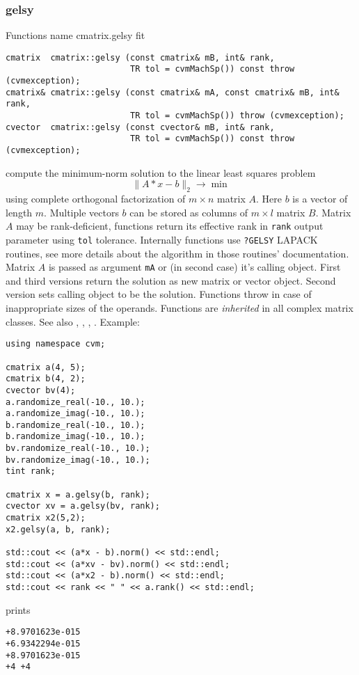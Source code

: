 \subsubsection{gelsy}
Functions%
\pdfdest name {cmatrix.gelsy} fit
\begin{verbatim}
cmatrix  cmatrix::gelsy (const cmatrix& mB, int& rank,
                         TR tol = cvmMachSp()) const throw (cvmexception);
cmatrix& cmatrix::gelsy (const cmatrix& mA, const cmatrix& mB, int& rank,
                         TR tol = cvmMachSp()) throw (cvmexception);
cvector  cmatrix::gelsy (const cvector& mB, int& rank,
                         TR tol = cvmMachSp()) const throw (cvmexception);
\end{verbatim}
compute the minimum-norm solution to the linear
least squares problem 
\begin{equation*}
\|A*x-b\|_2\to\min
\end{equation*}
using  complete orthogonal factorization of $m\times n$ matrix $A$.
Here $b$ is a vector of length $m$.
Multiple vectors $b$ can be stored as columns of $m\times l$ matrix $B$.
Matrix $A$ may be rank-deficient, functions return its effective rank in \verb"rank"
output parameter using \verb"tol" tolerance.
Internally functions use \verb"?GELSY" LAPACK routines, see more details
about the algorithm in those routines' documentation.
Matrix $A$ is passed as  argument \verb"mA" or (in second case) it's  calling object.
First and third versions return the solution as  new matrix or vector object.
Second version sets calling object to be the solution.
Functions throw
in case of inappropriate sizes of the operands.
Functions are \emph{inherited} in all complex matrix classes.
See also , , 
, .
Example:
\begin{Verbatim}
using namespace cvm;

cmatrix a(4, 5);
cmatrix b(4, 2);
cvector bv(4);
a.randomize_real(-10., 10.);
a.randomize_imag(-10., 10.);
b.randomize_real(-10., 10.);
b.randomize_imag(-10., 10.);
bv.randomize_real(-10., 10.);
bv.randomize_imag(-10., 10.);
tint rank;

cmatrix x = a.gelsy(b, rank);
cvector xv = a.gelsy(bv, rank);
cmatrix x2(5,2);
x2.gelsy(a, b, rank);

std::cout << (a*x - b).norm() << std::endl;
std::cout << (a*xv - bv).norm() << std::endl;
std::cout << (a*x2 - b).norm() << std::endl;
std::cout << rank << " " << a.rank() << std::endl;
\end{Verbatim}
prints
\begin{Verbatim}
+8.9701623e-015
+6.9342294e-015
+8.9701623e-015
+4 +4
\end{Verbatim}
\newpage



